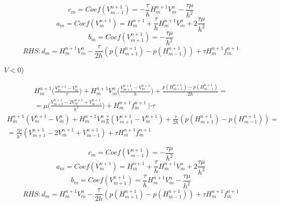 \documentclass[12pt]{article}
\begin{document}
\begin{enumerate}
\begin{equation}
    c_m = Coef(V^{n+1}_{m-1}) = - \frac{\tau}{h}H^{n+1}_mV^n_m - \frac{\tau\mu}{h^2}
\end{equation}
\begin{equation}
    a_m = Coef(V^{n+1}_{m}) = H^{n+1}_m + \frac{\tau}{h}H^{n+1}_mV^n_m + 2\frac{\tau\mu}{h^2}
\end{equation}
\begin{equation}
    b_m = Coef(V^{n+1}_{m+1}) = - \frac{\tau\mu}{h^2}
\end{equation}
\begin{equation}
        \displaystyle RHS : d_m = H^{n+1}_m V^n_m - \frac{\tau}{2h}(p(H^{n+1}_{m+1}) - p(H^{n+1}_{m-1})) + \tau H^{n+1}_m f^{n+1}_m
    \end{equation}

         $V < 0$)

\begin{align*}
    \displaystyle 
    H^{n+1}_m \Big( \frac{V^{n+1}_m - V^n_m}{\tau}\Big) + H^{n+1}_mV^n_m\Big( \frac{V^{n+1}_{m+1} - V^{n+1}_{m}}{h}\Big)  + \frac{p(H^{n+1}_{m+1}) - p(H^{n+1}_{m-1})}{2h} = \\ = \mu \Big( \frac{V^{n+1}_{m+1} - 2V^{n+1}_m + V^{n+1}_{m-1}}{h^2} \Big) + H^{n+1}_m f^{n+1}_m \ | \cdot \tau
\end{align*}
\begin{align*}
    \displaystyle 
    H^{n+1}_m ( V^{n+1}_m - V^n_m) + H^{n+1}_mV^n_m\frac{\tau}{h}(V^{n+1}_{m+1} - V^{n+1}_{m})  + \frac{\tau}{2h}(p(H^{n+1}_{m+1}) - p(H^{n+1}_{m-1})) = \\ = \frac{\tau \mu}{h^2} ( V^{n+1}_{m+1} - 2V^{n+1}_m + V^{n+1}_{m-1} ) + \tau H^{n+1}_m f^{n+1}_m
\end{align*}

\begin{equation}
    c_m = Coef(V^{n+1}_{m-1}) = - \frac{\tau\mu}{h^2}
\end{equation}
\begin{equation}
    a_m = Coef(V^{n+1}_{m}) = H^{n+1}_m + \frac{\tau}{h}H^{n+1}_mV^n_m + 2\frac{\tau\mu}{h^2}
\end{equation}
\begin{equation}
    b_m = Coef(V^{n+1}_{m+1}) = \frac{\tau}{h}H^{n+1}_mV^n_m - \frac{\tau\mu}{h^2}
\end{equation}
\begin{equation}
        \displaystyle RHS : d_m = H^{n+1}_m V^n_m - \frac{\tau}{2h}(p(H^{n+1}_{m+1}) - p(H^{n+1}_{m-1})) + \tau H^{n+1}_m f^{n+1}_m
    \end{equation}

\end{enumerate}






\end{document}

